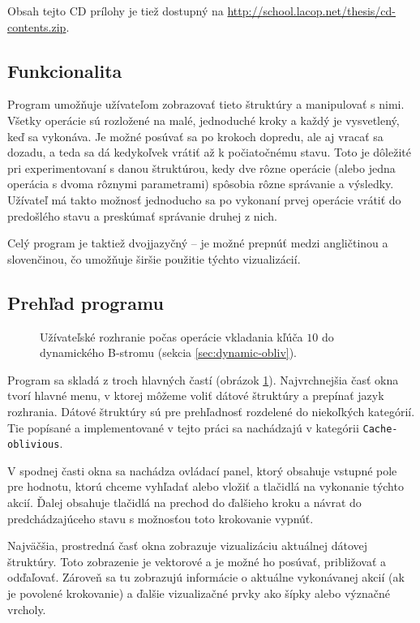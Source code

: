 Obsah tejto CD prílohy je tiež dostupný na \url{http://school.lacop.net/thesis/cd-contents.zip}.

\subsection{Funkcionalita}
Program umožňuje užívateľom zobrazovať tieto štruktúry a manipulovať s nimi. Všetky operácie sú rozložené na malé, jednoduché kroky a každý je vysvetlený, keď sa vykonáva. Je možné posúvať sa po krokoch dopredu, ale aj vracať sa dozadu, a teda sa dá kedykoľvek vrátiť až k počiatočnému stavu. Toto je dôležité pri experimentovaní s danou štruktúrou, kedy dve rôzne operácie (alebo jedna operácia s dvoma rôznymi parametrami) spôsobia rôzne správanie a výsledky. Užívateľ má takto možnosť jednoducho sa po vykonaní prvej operácie vrátiť do predošlého stavu a preskúmať správanie druhej z nich.

Celý program je taktiež dvojjazyčný -- je možné prepnúť medzi angličtinou a slovenčinou, čo umožňuje širšie použitie týchto vizualizácií.

\subsection{Prehľad programu}
\begin{figure}
    \centering
    \resizebox{0.9\textwidth}{!}{%
            
    }
    \caption[Užívateľské rozhranie]{Užívateľské rozhranie počas operácie vkladania kľúča $10$ do dynamického \obliv B-stromu (sekcia \ref{sec:dynamic-obliv}).}
    \label{fig:ss_overview}
\end{figure}

Program sa skladá z troch hlavných častí (obrázok \ref{fig:ss_overview}). Najvrchnejšia časť okna tvorí hlavné menu, v ktorej môžeme voliť dátové štruktúry a prepínať jazyk rozhrania. Dátové štruktúry sú pre prehľadnosť rozdelené do niekoľkých kategórií. Tie popísané a implementované v tejto práci sa nachádzajú v kategórii \texttt{Cache-oblivious}.

V spodnej časti okna sa nachádza ovládací panel, ktorý obsahuje vstupné pole pre hodnotu, ktorú chceme vyhľadať alebo vložiť a tlačidlá na vykonanie týchto akcií. Ďalej obsahuje tlačidlá na prechod do ďalšieho kroku a návrat do predchádzajúceho stavu s možnosťou toto krokovanie vypnúť.

Najväčšia, prostredná časť okna zobrazuje vizualizáciu aktuálnej dátovej štruktúry. Toto zobrazenie je vektorové a je možné ho posúvať, približovať a odďaľovať. Zároveň sa tu zobrazujú informácie o aktuálne vykonávanej akcií (ak je povolené krokovanie) a ďalšie vizualizačné prvky ako šípky alebo význačné vrcholy.

